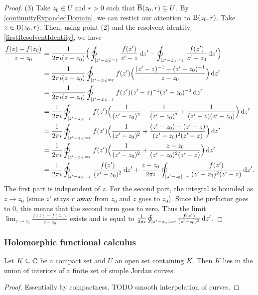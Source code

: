 \begin{proof}
(3) Take $z_0\in U$ and $r>0$ such that $\operatorname{\overline{B}}(z_0, r)\subseteq U$. By \ref{continuityExpandedDomain}, we can restict our attention to $\operatorname{B}(z_0, r)$. Take $z\in \operatorname{B}(z_0, r)$. Then, using point (2) and the resolvent identity \ref{firstResolventIdentity}, we have
\begin{align*}
\frac{f(z)- f(z_0)}{z-z_0} &= \frac{1}{2\pi i (z-z_0)}\Big(\oint_{|z'- z_0| = r}\frac{f(z')}{z'-z}\diff{z'} - \oint_{|z'- z_0| = r}\frac{f(z')}{z'-z_0}\diff{z'}\Big) \\
&= \frac{1}{2\pi i (z-z_0)}\oint_{|z'- z_0| = r}f(z')\Big(\frac{(z'-z)^{-1} - (z'-z_0)^{-1}}{z-z_0}\Big)\diff{z'} \\
&= \frac{1}{2\pi i (z-z_0)}\oint_{|z'- z_0| = r}f(z')(z'-z)^{-1}(z'-z_0)^{-1}\diff{z'} \\
&= \frac{1}{2\pi i}\oint_{|z'- z_0| = r}f(z')\Big(\frac{1}{(z'-z_0)^2} - \frac{1}{(z'-z_0)^2} + \frac{1}{(z'-z)(z'-z_0)}\Big)\diff{z'} \\
&= \frac{1}{2\pi i}\oint_{|z'- z_0| = r}f(z')\Big(\frac{1}{(z'-z_0)^2} + \frac{(z'-z_0)-(z'-z)}{(z'-z_0)^2(z'-z)}\Big)\diff{z'} \\
&= \frac{1}{2\pi i}\oint_{|z'- z_0| = r}f(z')\Big(\frac{1}{(z'-z_0)^2} + \frac{z-z_0}{(z'-z_0)^2(z'-z)}\Big)\diff{z'} \\
&= \frac{1}{2\pi i}\oint_{|z'- z_0| = r}\frac{f(z')}{(z'-z_0)^2}\diff{z'} + \frac{z-z_0}{2\pi i}\oint_{|z'- z_0| = r}\frac{f(z')}{(z'-z_0)^2(z'-z)}\diff{z'}.
\end{align*}
The first part is independent of $z$. For the second part, the integral is bounded as $z\to z_0$ (since $z'$ stays $r$ away from $z_0$ and $z$ goes to $z_0$). Since the prefactor goes to $0$, this means that the second term goes to zero. Thus the limit $\lim_{z\to z_0}\frac{f(z)-f(z_0)}{z-z_0}$ exists and is equal to $\frac{1}{2\pi i}\oint_{|z'- z_0| = r}\frac{f(z')}{(z'-z_0)^2}\operatorname{d \!}{z'}$.
\end{proof}

\subsubsection{Holomorphic functional calculus}

\begin{lemma}
Let $K\subseteq \mathbb{C}$ be a compact set and $U$ an open set containing $K$. Then $K$ lies in the union of interiors of a finite set of simple Jordan curves.
\end{lemma}
\begin{proof}
Essentially by compactness. TODO smooth interpolation of curves.
\end{proof}

